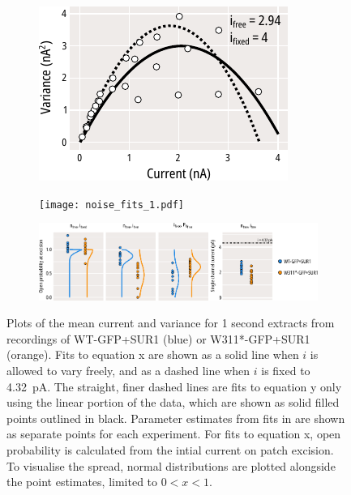 \begin{figure}[h]
\begin{subfigure}[t]{0.3\textwidth}
	\end{subfigure}
	\hfill
	\begin{subfigure}[t]{0.3\textwidth}
		\caption{}\label{ch4fig:simulated_noise_3}
		\centering
		\includegraphics[width=\textwidth]{simulated_noise_3.pdf}
	\end{subfigure}
	\caption[Simulated multibinomial currents]{
	}\label{ch4fig:noise_sim}
\end{figure}

\begin{figure}[h]
	\centering
	\begin{subfigure}[t]{0.9\textwidth}
		\caption{}\label{ch4fig:noise_fits_1}
		\centering
		\texttt{[image: noise\_fits\_1.pdf]}
	\end{subfigure}
	\vfill
	\begin{subfigure}[t]{0.9\textwidth}
		\caption{}\label{ch4fig:noise_fits_2}
		\centering
		\includegraphics[width=\textwidth]{noise_fits_2.pdf}
	\end{subfigure}
	\caption[Estimating open probability from stationary noise analysis]{
	 Plots of the mean current and variance for 1 second extracts from recordings of WT-GFP+SUR1 (blue) or W311*-GFP+SUR1 (orange).
	Fits to equation x are shown as a solid line when $i$ is allowed to vary freely, and as a dashed line when $i$ is fixed to \SI{4.32}{\pico\ampere}.
	The straight, finer dashed lines are fits to equation y only using the linear portion of the data, which are shown as solid filled points outlined in black.
	 Parameter estimates from fits in  are shown as separate points for each experiment.
	For fits to equation x, open probability is calculated from the intial current on patch excision.
	To visualise the spread, normal distributions are plotted alongside the point estimates, limited to $0 < x < 1$.
	}\label{ch4fig:all_noise_fits}
\end{figure}

